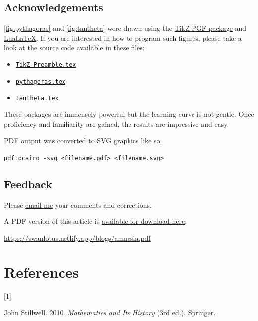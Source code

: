 \documentclass[
  a4paper,
]{article}
\providecommand{\tightlist}{%
  \setlength{\itemsep}{0pt}\setlength{\parskip}{0pt}}
\newlength{\cslhangindent}
\newlength{\csllabelwidth}
\newenvironment{CSLReferences}[2] %
 {\begin{list}{}{%
  \setlength{\itemindent}{0pt}
  \setlength{\leftmargin}{0pt}
  \setlength{\parsep}{0pt}
  \ifodd #1
   \setlength{\leftmargin}{\cslhangindent}
   \setlength{\itemindent}{-1\cslhangindent}
  \fi
  \setlength{\itemsep}{#2\baselineskip}}}
 {\end{list}}
\newcommand{\CSLLeftMargin}[1]{\parbox[t]{\csllabelwidth}{\strut#1\strut}}
\newcommand{\CSLRightInline}[1]{\parbox[t]{\linewidth - \csllabelwidth}{\strut#1\strut}}
\begin{document}
\subsection{Acknowledgements}\label{acknowledgements}

\cref{fig:pythagoras} and \cref{fig:tantheta} were drawn using the
\href{https://en.wikipedia.org/wiki/PGF/TikZ}{TikZ-PGF package} and
\href{https://en.wikipedia.org/wiki/LuaTeX}{LuaLaTeX}. If you are
interested in how to program such figures, please take a look at the
source code available in these files:

\begin{itemize}
\tightlist
\item
  \href{auxiliary/TikZ-Preamble.tex}{\texttt{TikZ-Preamble.tex}}
\item
  \href{auxiliary/pythagoras.tex}{\texttt{pythagoras.tex}}
\item
  \href{auxiliary/tantheta.tex}{\texttt{tantheta.tex}}
\end{itemize}

These packages are immensely powerful but the learning curve is not
gentle. Once proficiency and familiarity are gained, the results are
impressive and easy.

PDF output was converted to SVG graphics like so:

\texttt{pdftocairo\ -svg\ \textless{}filename.pdf\textgreater{}\ \textless{}filename.svg\textgreater{}}

\subsection{Feedback}\label{feedback}

Please \href{mailto:feedback.swanlotus@gmail.com}{email me} your
comments and corrections.

\noindent A PDF version of this article is
\href{./amnesia.pdf}{available for download here}:

\begin{small}

\begin{sffamily}

\url{https://swanlotus.netlify.app/blogs/amnesia.pdf}

\end{sffamily}

\end{small}

\section*{References}\label{bibliography}

\label{refs}
\begin{CSLReferences}{0}{0}
\CSLLeftMargin{{[}1{]} }%
\CSLRightInline{John Stillwell. 2010. \emph{{Mathematics and Its
History}} (3rd ed.). Springer.}

\end{CSLReferences}
\end{document}
